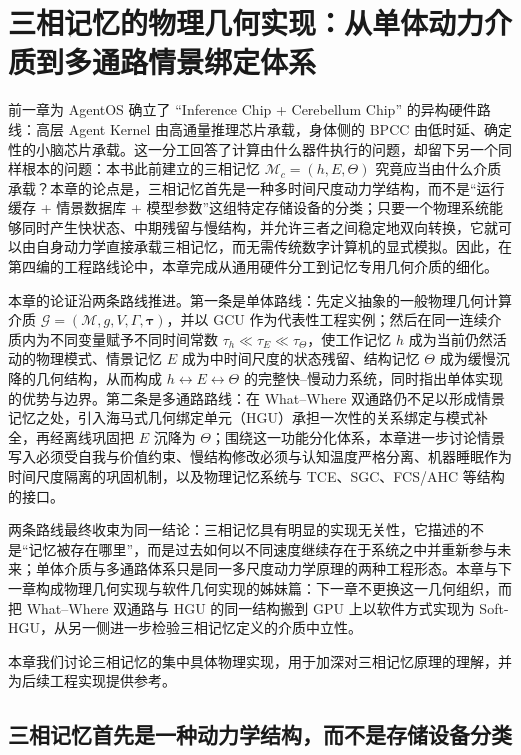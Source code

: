 \chapter{三相记忆的物理几何实现：从单体动力介质到多通路情景绑定体系}

\begin{chapterlead}
前一章为 AgentOS 确立了 ``Inference Chip + Cerebellum Chip'' 的异构硬件路线：高层 Agent Kernel 由高通量推理芯片承载，身体侧的 BPCC 由低时延、确定性的小脑芯片承载。这一分工回答了计算由什么器件执行的问题，却留下另一个同样根本的问题：本书此前建立的三相记忆 $\mathcal{M}_c=(h,E,\Theta)$ 究竟应当由什么介质承载？本章的论点是，三相记忆首先是一种多时间尺度动力学结构，而不是“运行缓存 + 情景数据库 + 模型参数”这组特定存储设备的分类；只要一个物理系统能够同时产生快状态、中期残留与慢结构，并允许三者之间稳定地双向转换，它就可以由自身动力学直接承载三相记忆，而无需传统数字计算机的显式模拟。因此，在第四编的工程路线论中，本章完成从通用硬件分工到记忆专用几何介质的细化。

本章的论证沿两条路线推进。第一条是单体路线：先定义抽象的一般物理几何计算介质 $\mathcal{G}=(\mathcal{M},g,V,\Gamma,\boldsymbol{\tau})$，并以 GCU 作为代表性工程实例；然后在同一连续介质内为不同变量赋予不同时间常数 $\tau_h\ll\tau_E\ll\tau_\Theta$，使工作记忆 $h$ 成为当前仍然活动的物理模式、情景记忆 $E$ 成为中时间尺度的状态残留、结构记忆 $\Theta$ 成为缓慢沉降的几何结构，从而构成 $h\leftrightarrow E\leftrightarrow\Theta$ 的完整快--慢动力系统，同时指出单体实现的优势与边界。第二条是多通路路线：在 What--Where 双通路仍不足以形成情景记忆之处，引入海马式几何绑定单元（HGU）承担一次性的关系绑定与模式补全，再经离线巩固把 $E$ 沉降为 $\Theta$；围绕这一功能分化体系，本章进一步讨论情景写入必须受自我与价值约束、慢结构修改必须与认知温度严格分离、机器睡眠作为时间尺度隔离的巩固机制，以及物理记忆系统与 TCE、SGC、FCS/AHC 等结构的接口。

两条路线最终收束为同一结论：三相记忆具有明显的实现无关性，它描述的不是“记忆被存在哪里”，而是过去如何以不同速度继续存在于系统之中并重新参与未来；单体介质与多通路体系只是同一多尺度动力学原理的两种工程形态。本章与下一章构成物理几何实现与软件几何实现的姊妹篇：下一章不更换这一几何组织，而把 What--Where 双通路与 HGU 的同一结构搬到 GPU 上以软件方式实现为 Soft-HGU，从另一侧进一步检验三相记忆定义的介质中立性。
\end{chapterlead}

本章我们讨论三相记忆的集中具体物理实现，用于加深对三相记忆原理的理解，并为后续工程实现提供参考。
\section{三相记忆首先是一种动力学结构，而不是存储设备分类}

